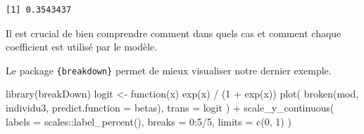 \documentclass[
  letterpaper,
  DIV=11,
  numbers=noendperiod,
  oneside]{scrreprt}
\newenvironment{Shaded}{\begin{snugshade}}{\end{snugshade}}
\newcommand{\AttributeTok}[1]{\textcolor[rgb]{0.40,0.45,0.13}{#1}}
\newcommand{\ControlFlowTok}[1]{\textcolor[rgb]{0.00,0.23,0.31}{#1}}
\newcommand{\DecValTok}[1]{\textcolor[rgb]{0.68,0.00,0.00}{#1}}
\newcommand{\FunctionTok}[1]{\textcolor[rgb]{0.28,0.35,0.67}{#1}}
\newcommand{\NormalTok}[1]{\textcolor[rgb]{0.00,0.23,0.31}{#1}}
\newcommand{\OtherTok}[1]{\textcolor[rgb]{0.00,0.23,0.31}{#1}}
\newcommand{\SpecialCharTok}[1]{\textcolor[rgb]{0.37,0.37,0.37}{#1}}
\newcommand{\StringTok}[1]{\textcolor[rgb]{0.13,0.47,0.30}{#1}}
\begin{document}
\begin{verbatim}
[1] 0.3543437
\end{verbatim}

Il est crucial de bien comprendre comment dans quels cas et comment
chaque coefficient est utilisé par le modèle.

Le package \texttt{\{breakdown\}} permet de mieux visualiser notre
dernier exemple.

\begin{Shaded}
\end{Shaded}

\begin{Shaded}
\begin{Highlighting}[]
\FunctionTok{library}\NormalTok{(breakDown)}
\NormalTok{logit }\OtherTok{\textless{}{-}} \ControlFlowTok{function}\NormalTok{(x) }\FunctionTok{exp}\NormalTok{(x) }\SpecialCharTok{/}\NormalTok{ (}\DecValTok{1} \SpecialCharTok{+} \FunctionTok{exp}\NormalTok{(x))}
\FunctionTok{plot}\NormalTok{(}
  \FunctionTok{broken}\NormalTok{(mod, individu3, }\AttributeTok{predict.function =}\NormalTok{ betas),}
  \AttributeTok{trans =}\NormalTok{ logit}
\NormalTok{) }\SpecialCharTok{+}
  \FunctionTok{scale\_y\_continuous}\NormalTok{(}
    \AttributeTok{labels =}\NormalTok{ scales}\SpecialCharTok{::}\FunctionTok{label\_percent}\NormalTok{(),}
    \AttributeTok{breaks =} \DecValTok{0}\SpecialCharTok{:}\DecValTok{5}\SpecialCharTok{/}\DecValTok{5}\NormalTok{,}
    \AttributeTok{limits =} \FunctionTok{c}\NormalTok{(}\DecValTok{0}\NormalTok{, }\DecValTok{1}\NormalTok{)}
\NormalTok{  )}
\end{Highlighting}
\end{Shaded}
\end{document}
